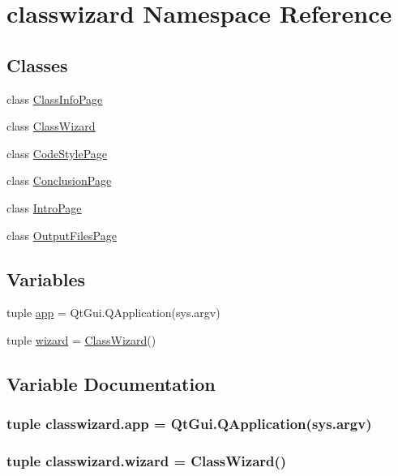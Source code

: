 \hypertarget{namespaceclasswizard}{}\section{classwizard Namespace Reference}
\label{namespaceclasswizard}
\subsection*{Classes}
\begin{DoxyCompactItemize}
\item 
class \hyperlink{classclasswizard_1_1ClassInfoPage}{Class\+Info\+Page}
\item 
class \hyperlink{classclasswizard_1_1ClassWizard}{Class\+Wizard}
\item 
class \hyperlink{classclasswizard_1_1CodeStylePage}{Code\+Style\+Page}
\item 
class \hyperlink{classclasswizard_1_1ConclusionPage}{Conclusion\+Page}
\item 
class \hyperlink{classclasswizard_1_1IntroPage}{Intro\+Page}
\item 
class \hyperlink{classclasswizard_1_1OutputFilesPage}{Output\+Files\+Page}
\end{DoxyCompactItemize}
\subsection*{Variables}
\begin{DoxyCompactItemize}
\item 
tuple \hyperlink{namespaceclasswizard_a89caf9265cc0a862b6cd5cf6597ba563}{app} = Qt\+Gui.\+Q\+Application(sys.\+argv)
\item 
tuple \hyperlink{namespaceclasswizard_a00ac4b47703d0f8b35b1b8125624fd94}{wizard} = \hyperlink{classclasswizard_1_1ClassWizard}{Class\+Wizard}()
\end{DoxyCompactItemize}


\subsection{Variable Documentation}
\hypertarget{namespaceclasswizard_a89caf9265cc0a862b6cd5cf6597ba563}{}
\subsubsection[{app}]{\setlength{\rightskip}{0pt plus 5cm}tuple classwizard.\+app = Qt\+Gui.\+Q\+Application(sys.\+argv)}\label{namespaceclasswizard_a89caf9265cc0a862b6cd5cf6597ba563}
\hypertarget{namespaceclasswizard_a00ac4b47703d0f8b35b1b8125624fd94}{}
\subsubsection[{wizard}]{\setlength{\rightskip}{0pt plus 5cm}tuple classwizard.\+wizard = {\bf Class\+Wizard}()}\label{namespaceclasswizard_a00ac4b47703d0f8b35b1b8125624fd94}
